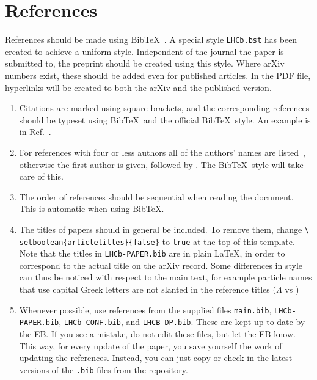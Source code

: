 \section{References}
\label{sec:References}

References should be made using Bib\TeX~\cite{BibTeX}. A special style
\texttt{LHCb.bst} has been created to achieve a uniform
style. Independent of the journal the paper is submitted to, the
preprint should be created using this style. Where arXiv numbers
exist, these should be added even for published articles. In the PDF
file, hyperlinks will be created to both the arXiv and the published
version.

\begin{enumerate}

\item Citations are marked using square brackets, and the
  corresponding references should be typeset using Bib\TeX\ and the
  official \lhcb Bib\TeX\ style. An example is in
  Ref.~\cite{Sjostrand:2006za}.

\item For references with four or less authors all of the authors'
  names are listed~\cite{Majorana:1937vz}, otherwise the first author
  is given, followed by \etal. The \lhcb Bib\TeX\ style will
  take care of this.

\item The order of references should be sequential when reading the
  document. This is automatic when using Bib\TeX.

\item The titles of papers should in general be included. To remove
  them, change \texttt{\textbackslash
    setboolean\{articletitles\}\{false\}} to \texttt{true} at the top
  of this template.
  Note that the titles in \verb!LHCb-PAPER.bib! are in plain \LaTeX,
  in order to correspond to the actual title on the arXiv record.
  Some differences in style can thus be noticed with respect to the
  main text, for example particle names that use capital Greek letters
  are not slanted in the reference titles ($\Lambda$ vs \Lz)  

\item Whenever possible, use references from the supplied files
\verb!main.bib!, \verb!LHCb-PAPER.bib!, \verb!LHCb-CONF.bib!, and \verb!LHCB-DP.bib!.
These are kept up-to-date by the EB. If you see a mistake, do not edit these files,
but let the EB know. This way, for every update of the paper, you save
yourself the work of updating the references. Instead, you can just copy or
check in the latest versions of the \verb!.bib! files from the repository.   


\end{enumerate}
